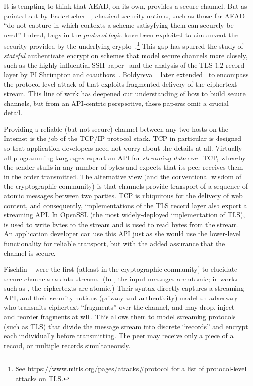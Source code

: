 It is tempting to think that AEAD, on its own, provides a secure channel.  But
as pointed out by Badertscher \etal~\cite{BMM+15}, classical security
notions, such as those for AEAD ``do not capture in which contexts a scheme
satisyfying them can securely be used.''  Indeed, bugs in the
\emph{protocol logic} have been exploited to circumvent the
security provided by the underlying
crypto~\cite{Vau02,BKN02,APW09}.\footnote{See
\url{https://www.mitls.org/pages/attacks\#protocol} for a list of
protocol-level attacks on TLS.}  This gap has spurred the study of
\emph{stateful} authenticate encryption schemes that model secure channels more
closely, such as the highly influential SSH paper~\cite{BKN02} and the analysis
of the TLS $1.2$ record layer by PI Shrimpton and coauthors~\cite{PRS11}. Boldyreva
\etal~\cite{BDPS12} later extended~\cite{BKN02} to encompass the protocol-level
attack of \cite{APW09} that exploits fragmented delivery of the ciphertext stream. This
line of work has deepened our understanding of how to build secure channels, but from
an API-centric perspective, these paperss omit a crucial detail.

%
Providing a reliable (but not secure) channel between any two hosts on the
Internet is the job of the TCP/IP protocol stack. TCP in particular is designed
so that application developers need not worry about the details at all.
Virtually all programming languages export an API for \emph{streaming data} over
TCP, whereby the sender stuffs in any number of bytes and expects that its peer
receives them in the order transmitted.  The alternative view (and the
conventional wisdom of the cryptographic community) is that channels provide
transport of a sequence of atomic messages between two parties.  TCP is
ubiquitous for the delivery of web content, and consequently, implementations of
the TLS record layer also export a streaming API. In OpenSSL (the most
widely-deployed implementation of TLS),  is used to write
bytes to the stream and  is used to read bytes from the
stream. An application developer can use this API just as she would use the
lower-level functionality for reliable transport, but with the added assurance
that the channel is secure.

Fischlin \etal~\cite{FPMG15} were the first (atleast in the cryptographic
community) to elucidate secure channels as data streams. (In \cite{BDPS12}, the
input messages are atomic; in works such as \cite{BFK+13,DLFK+17}, the
ciphertexts are atomic.)
%
Their syntax directly captures a streaming API, and their security notions
(privacy and authenticity) model an adversary who transmits ciphertext
``fragments'' over the channel, and may drop, inject, and reorder fragments at
will.  This allows them to model streaming protocols (such as TLS) that divide
the message stream into discrete ``records'' and encrypt each individually
before transmitting. The peer may receive only a piece of a record, or multiple
records simultaneously.


